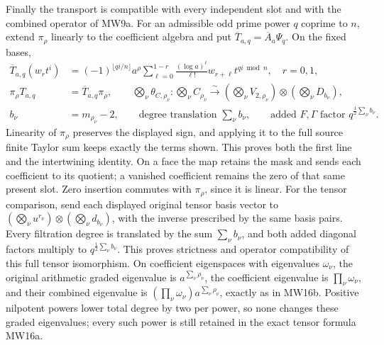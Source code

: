 Finally the transport is compatible with every independent slot
and with the combined operator of MW9a. For an admissible odd
prime power \(q\) coprime to \(n\), extend \(\pi_\rho\) linearly
to the coefficient algebra and put
\(\overline T_{a,q}=\overline A_a\Psi_q\). On the fixed bases,
\[
 \begin{aligned}
 \overline T_{a,q}(w_rt^i)
   &=(-1)^{\lfloor qi/n\rfloor}a^\rho
       \sum_{\ell=0}^{1-r}\frac{(\log a)^\ell}{\ell!}
                              w_{r+\ell}t^{qi\bmod n},\quad r=0,1,\\
 \pi_\rho T_{a,q}&=\overline T_{a,q}\pi_\rho,\qquad
 \bigotimes_\nu\theta_{C,\rho_\nu}:
     \bigotimes_\nu C_{\rho_\nu}\xrightarrow{\sim}
     \left(\bigotimes_\nu V_{2,\rho_\nu}\right)
                          \otimes\left(\bigotimes_\nu D_{b_\nu}\right),\\
 b_\nu&=m_{\rho_\nu}-2,\qquad
 \text{degree translation }\sum_\nu b_\nu,\qquad
 \text{added }F,\Gamma\text{ factor }q^{\frac12\sum_\nu b_\nu}.
 \end{aligned}
 \tag{MRE42}
\]
Linearity of \(\pi_\rho\) preserves the displayed sign, and applying
it to the full source finite Taylor sum keeps exactly the terms
shown. This proves both the first line and the intertwining
identity. On a face the map retains the mask and sends each
coefficient to its quotient; a vanished coefficient remains the
zero of that same present slot. Zero insertion commutes with
\(\pi_\rho\), since it is linear. For the tensor comparison,
send each displayed original tensor basis vector to
\((\bigotimes_\nu u^{r_\nu})\otimes
(\bigotimes_\nu d_{b_\nu})\), with the inverse prescribed by the
same basis pairs. Every filtration degree is translated by the
sum \(\sum_\nu b_\nu\), and both added diagonal factors multiply
to \(q^{\frac12\sum_\nu b_\nu}\). This proves strictness and
operator compatibility of this full tensor isomorphism.
On coefficient eigenspaces with eigenvalues \(\omega_\nu\), the
original arithmetic graded eigenvalue is \(a^{\sum_\nu\rho_\nu}\),
the coefficient eigenvalue is \(\prod_\nu\omega_\nu\), and their
combined eigenvalue is
\((\prod_\nu\omega_\nu)a^{\sum_\nu\rho_\nu}\), exactly as in
MW16b. Positive nilpotent powers lower total degree by two per
power, so none changes these graded eigenvalues; every such
power is still retained in the exact tensor formula MW16a.

